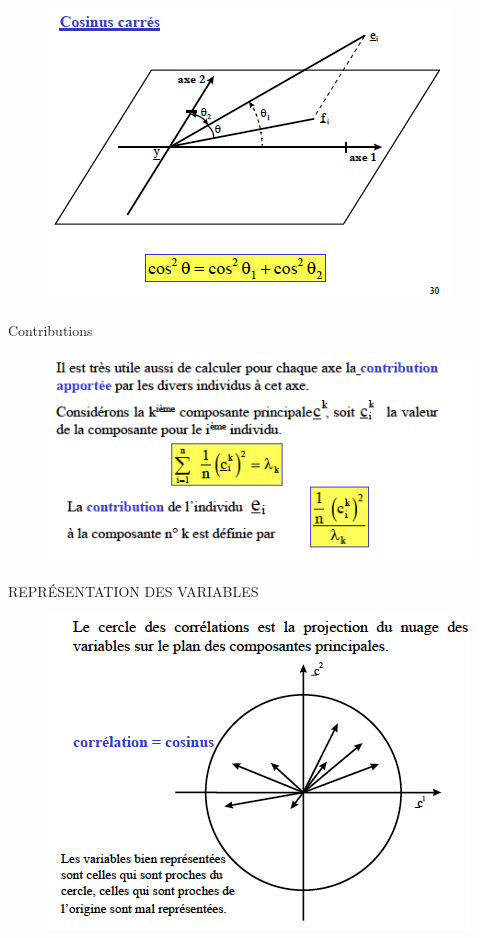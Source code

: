 \documentclass[11pt]{beamer}
\begin{document}
\begin{frame}{}

\begin{figure}
\includegraphics[scale=0.6]{schema24.png} 
\end{figure}

\end{frame}


\begin{frame}{Contributions}

\begin{figure}
\includegraphics[scale=0.6]{schema25.png} 
\end{figure}

\end{frame}


\begin{frame}{REPRÉSENTATION DES VARIABLES}

\begin{figure}
\includegraphics[scale=0.6]{schema26.png} 
\end{figure}

\end{frame}
\end{document}
